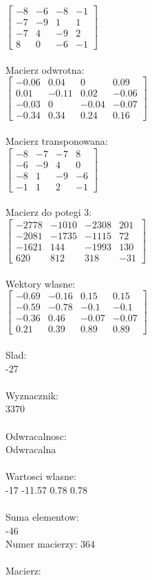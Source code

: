 \documentclass[a4paper,12pt]{article}
\begin{document}
$\begin{bmatrix} -8&-6&-8&-1\\-7&-9&1&1\\-7&4&-9&2\\8&0&-6&-1 \end{bmatrix}$
\\
\\
Macierz odwrotna:\\

$\begin{bmatrix} -0.06&0.04&0&0.09\\0.01&-0.11&0.02&-0.06\\-0.03&0&-0.04&-0.07\\-0.34&0.34&0.24&0.16 \end{bmatrix}$
\\
\\
Macierz transponowana:\\

$\begin{bmatrix} -8&-7&-7&8\\-6&-9&4&0\\-8&1&-9&-6\\-1&1&2&-1 \end{bmatrix}$
\\
\\
Macierz do potegi 3:\\

$\begin{bmatrix} -2778&-1010&-2308&201\\-2081&-1735&-1115&72\\-1621&144&-1993&130\\620&812&318&-31 \end{bmatrix}$
\\
\\
Wektory wlasne:\\

$\begin{bmatrix} -0.69&-0.16&0.15&0.15\\-0.59&-0.78&-0.1&-0.1\\-0.36&0.46&-0.07&-0.07\\0.21&0.39&0.89&0.89 \end{bmatrix}$
\\
\\
Slad:\\
-27
\\
\\
Wyznacznik:\\
3370
\\
\\
Odwracalnosc:\\
Odwracalna
\\
\\
Wartosci wlasne:\\
-17 -11.57 0.78 0.78
\\
\\
Suma elementow:\\
-46
\\
\newpage
Numer macierzy:
364
\\
\\
Macierz:\\
\end{document}
